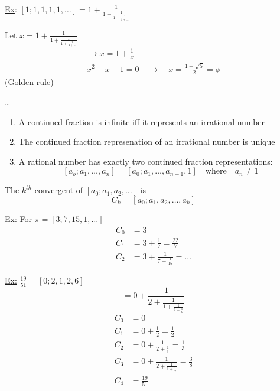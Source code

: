     \underline{Ex}: $[1;1,1,1,1,\dots] = 1 + \frac{1}{1 + \frac{1}{1 + \frac{1}{1 + \dots}}}$

    Let $x = 1 + \frac{1}{1 + \frac{1}{1 + \frac{1}{1 + \dots}}}$
    \begin{align*}
        \rightarrow x = 1 + \frac{1}{x} \\
        x^2 - x - 1 = 0 \quad\rightarrow\quad x = \frac{1 + \sqrt{5}}{2} = \phi
    \end{align*}
    (Golden rule)

    \begin{theorem}
        \dots
        \begin{enumerate}
            \item A continued fraction is infinite iff it represents an irrational number
            \item The continued fraction represenation of an irrational number is unique
            \item A rational number has exactly two continued fraction representations: 
                \[
                    [a_o; a_1, \dots, a_n] = [a_0; a_1, \dots, a_{n-1}, 1] \quad\text{where}\quad a_n \ne 1
                \]
        \end{enumerate}
    \end{theorem}

    \begin{definition}
        The \underline{$k^{th}$ convergent} of $[a_0; a_1, a_2, \dots]$ is 
        \[
            C_k = [a_0; a_1, a_2, \dots, a_k]
        \]
    \end{definition}

    \underline{Ex:} For $\pi = [3;7,15,1,\dots]$
    \begin{align*}
        C_0 &= 3 \\
        C_1 &= 3 + \frac{1}{7} = \frac{22}{7} \\
        C_2 &= 3 + \frac{1}{7 + \frac{1}{15}} = \dots
    \end{align*}

    \underline{Ex:} $\frac{19}{51} = [0;2,1,2,6]$
    \[
        = 0 + \frac{1}{2 + \frac{1}{1 + \frac{1}{2 + \frac{1}{6}}}}
    \]
    \begin{align*}
        C_0 &= 0 \\
        C_1 &= 0 + \frac{1}{2} = \frac{1}{2} \\
        C_2 &= 0 + \frac{1}{2 + \frac{1}{1}} = \frac{1}{3} \\
        C_3 &= 0 + \frac{1}{2 + \frac{1}{1 + \frac{1}{2}}} = \frac{3}{8} \\
        C_4 &= \frac{19}{51}
    \end{align*}

